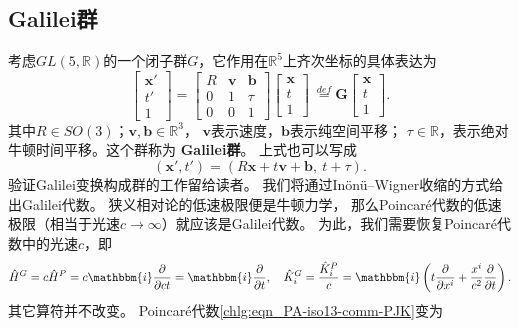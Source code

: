 \subsection{Galilei群}\label{chlg:sec_Galilei-group}
考虑$GL(5, \mathbb{R})$的一个闭子群$G$，它作用在$\mathbb{R}^5$上齐次坐标的具体表达为
\begin{equation}\label{chlg:eqn_Galilei-max}
    \begin{bmatrix}  \boldsymbol{x}' \\ t'\\ 1 \end{bmatrix} =
    \begin{bmatrix}  R & \boldsymbol{v} & \boldsymbol{b} \\0 & 1 & \tau \\ 0 &0 & 1  \end{bmatrix}
    \begin{bmatrix}  \boldsymbol{x} \\t\\ 1 \end{bmatrix} 
    \  \overset{def}{=} \boldsymbol{G} \begin{bmatrix}  \boldsymbol{x} \\ t\\ 1 \end{bmatrix} .
\end{equation}
其中$R \in S O(3)$；$\boldsymbol{v}, \boldsymbol{b} \in \mathbb{R}^3$，
$\boldsymbol{v}$表示速度，$\boldsymbol{b}$表示纯空间平移；
$\tau \in \mathbb{R}$，表示绝对牛顿时间平移。这个群称为 {\heiti\bfseries Galilei群}。
上式也可以写成
\begin{equation}
    (\boldsymbol{x}', t') = (R \boldsymbol{x}+t \boldsymbol{v}+ \boldsymbol{b},\ t+\tau) .
\end{equation}
验证Galilei变换构成群的工作留给读者。
我们将通过In\"on\"u--Wigner{\kaishu 收缩}的方式给出Galilei代数。
狭义相对论的低速极限便是牛顿力学，
那么Poincar\'{e}代数的低速极限（相当于光速$c\to \infty$）就应该是Galilei代数。
为此，我们需要恢复Poincar\'{e}代数中的光速$c$，即
\begin{equation}
    \hat{H}^G =c\hat{H}^P = c\mathbbm{i}\frac{\partial }{ \partial ct }
    = \mathbbm{i}\frac{\partial }{ \partial t }, \quad
    \hat{K}_i^G = \frac{\hat{K}_i^P}{c}= \mathbbm{i} \left(t\frac{\partial }{\partial x^i}+  
    \frac{x^i}{c^2}\frac{\partial }{\partial t}\right) .
\end{equation}
其它算符并不改变。
Poincar\'{e}代数\eqref{chlg:eqn_PA-iso13-comm-PJK}变为
